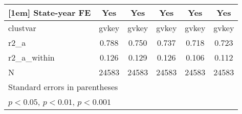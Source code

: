 {\begin{tabular}{l*{5}{c}}
[1em]
State-year FE&         Yes         &         Yes         &         Yes         &         Yes         &         Yes         \\
\hline
clustvar    &       gvkey         &       gvkey         &       gvkey         &       gvkey         &       gvkey         \\
r2\_a        &       0.788         &       0.750         &       0.737         &       0.718         &       0.723         \\
r2\_a\_within &       0.126         &       0.129         &       0.126         &       0.106         &       0.112         \\
N           &       24583         &       24583         &       24583         &       24583         &       24583         \\
\hline\hline
\multicolumn{6}{l}{\footnotesize Standard errors in parentheses}\\
\multicolumn{6}{l}{\footnotesize \sym{*} \(p<0.05\), \sym{**} \(p<0.01\), \sym{***} \(p<0.001\)}\\
\end{tabular}
}
